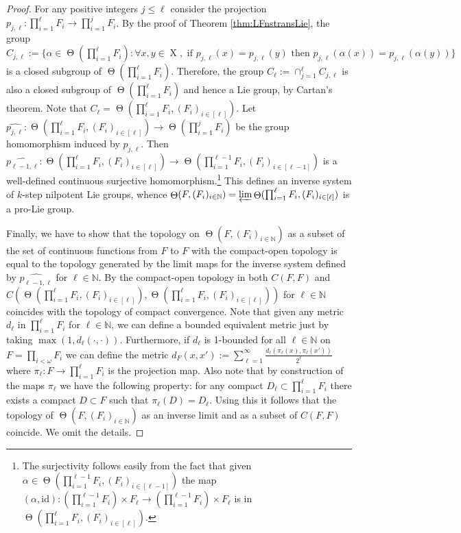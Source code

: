 \documentclass[a4paper,12pt,reqno]{amsart}
\theoremstyle{definition}
\def\to{\rightarrow}
\newcommand{\mb}{\mathbb}
\newcommand{\id}{\mathrm{id}}
\DeclareMathOperator{\tran}{\Theta}
\DeclareMathOperator{\ns}{X}
\begin{document}
\begin{proof}
For any positive integers $j\le \ell$ consider the projection $p_{j,\ell}:\prod_{i=1}^\ell F_i \to \prod_{i=1}^j F_i$. By the proof of Theorem \ref{thm:LFnstransLie}, the group $C_{j,\ell}:=\{\alpha\in \tran(\prod_{i=1}^\ell F_i): \forall x,y\in \ns, \text{ if } p_{j,\ell}(x)=p_{j,\ell}(y) \text{ then } p_{j,\ell}(\alpha(x))=p_{j,\ell}(\alpha(y))\}$ is a closed subgroup of $\tran(\prod_{i=1}^\ell F_i)$. Therefore, the group $C_\ell:=\cap_{j=1}^\ell C_{j,\ell}$ is also a closed subgroup of $\tran(\prod_{i=1}^\ell F_i)$ and hence a Lie group, by Cartan's theorem. Note that $C_\ell = \tran(\prod_{i=1}^\ell F_i,(F_i)_{i\in [\ell]})$. Let $\widehat{p_{j,\ell}}:\tran(\prod_{i=1}^\ell F_i,(F_i)_{i\in [\ell]})\to \tran(\prod_{i=1}^j F_i)$ be the group homomorphism induced by $p_{j,\ell}$. Then $\widehat{p_{\ell-1,\ell}}:\tran(\prod_{i=1}^\ell F_i,(F_i)_{i\in [\ell]})\to \tran(\prod_{i=1}^{\ell-1} F_i,(F_i)_{i\in [\ell-1]})$ is a well-defined continuous surjective homomorphism.\footnote{The surjectivity follows easily from the fact that given $\alpha\in \tran(\prod_{i=1}^{\ell-1} F_i,(F_i)_{i\in [\ell-1]})$ the map $(\alpha,\id): (\prod_{i=1}^{\ell-1} F_i)\times F_\ell\to ( \prod_{i=1}^{\ell-1} F_i)\times F_\ell$ is in $\tran(\prod_{i=1}^{\ell} F_i,(F_i)_{i\in [\ell]})$.} This defines an inverse system of $k$-step nilpotent Lie groups, whence $\tran(F,(F_i)_{i\in \mb{N}})=\varprojlim \tran(\prod_{i=1}^\ell F_i,(F_i)_{i\in [\ell]})$ is a pro-Lie group.

Finally, we have to show that the topology on $\tran(F,(F_i)_{i\in \mb{N}})$ as a subset of the set of continuous functions from $F$ to $F$ with the compact-open topology is equal to the topology generated by the limit maps for the inverse system defined by  $\widehat{p_{\ell-1,\ell}}$ for $\ell\in \mb{N}$. By \cite[Theorem 46.8]{Mu} the compact-open topology in both $C(F,F)$ and $C(\tran(\prod_{i=1}^\ell F_i,(F_i)_{i\in [\ell]}),\tran(\prod_{i=1}^\ell F_i,(F_i)_{i\in [\ell]}))$ for $\ell\in \mb{N}$ coincides with the topology of compact convergence. Note that given any metric $d_\ell$ in $\prod_{i=1}^\ell F_i$ for $\ell\in \mb{N}$, we can define a bounded equivalent metric just by taking $\max(1,d_\ell(\cdot,\cdot))$. Furthermore, if $d_\ell$ is 1-bounded for all $\ell\in \mb{N}$ on $F=\prod_{i<\omega} F_i$ we can define the metric $d_F(x,x'):=\sum_{\ell=1}^\infty \frac{d_\ell(\pi_\ell(x),\pi_\ell(x'))}{2^\ell}$ where $\pi_\ell:F\to \prod_{i=1}^\ell F_i$ is the projection map. Also note that by construction of the maps $\pi_\ell$ we have the following property: for any compact $D_\ell\subset \prod_{i=1}^\ell F_i$ there exists a compact $D\subset F$ such that $\pi_\ell(D)=D_\ell$. Using this it follows that the topology of $\tran(F,(F_i)_{i\in \mb{N}})$ as an inverse limit and as a subset of $C(F,F)$ coincide. We omit the details.
\end{proof}
\end{document}
